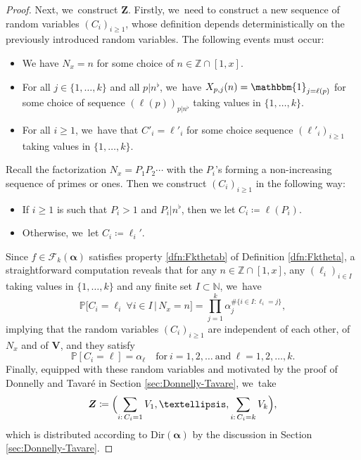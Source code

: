 \documentclass[10pt,a4paper]{amsart}
\newcommand{\bV}{{\boldsymbol V}}
\newcommand{\bZ}{{\boldsymbol Z}}
\newcommand{\NN}{\mathbb{N}}
\newcommand{\ZZ}{\mathbb{Z}}
\newcommand{\PP}{\mathbb{P}}
\newcommand{\boldalpha}{\boldsymbol{\alpha}}
\newcommand{\one}{\mathbbm{1}}
\newcommand{\bg}{\big}
\theoremstyle{plain}
\theoremstyle{definition}
\begin{document}
\begin{proof}
Next, we~construct $\bZ$. Firstly, we~need to construct a new sequence of random variables $(C_i)_{i\ge1}$, whose definition depends deterministically on the previously introduced random variables. The following events must occur:
\begin{itemize}
\item We have $N_x = n$ for some choice of $n \in \ZZ \cap [1, x]$.
\item For all $j \in \{1, \ldots, k\}$ and all $p|n^\flat$, we~have $X_{p, j}(n) = \one_{j=\ell(p)}$ for some choice of sequence $(\ell(p))_{p | n^\flat}$ taking values in $\{1, \ldots, k\}$.
\item For all $i \ge 1$, we~have that $C'_i = \ell'_i$ for some choice sequence $(\ell'_i)_{i \ge 1}$ taking values in $\{1, \ldots, k\}$.
\end{itemize}
Recall the factorization $N_x=P_1P_2\cdots$ with the $P_i$'s forming a non-increasing sequence of primes or ones. Then we construct $(C_i)_{i \ge 1}$ in the following way:
\begin{itemize}
\item If $i\ge1$ is such that $P_i > 1$ and $P_i|n^\flat$, then we let $C_i\coloneqq\ell(P_i)$.
\item Otherwise, we~let $C_i\coloneqq \ell_i'$.
\end{itemize}
Since $f\in\mathcal F_k(\boldalpha)$ satisfies property \eqref{dfn:Fkthetab} of Definition \ref{dfn:Fktheta}, a straightforward computation reveals that for any $n \in \ZZ \cap [1, x]$, any $(\ell_i)_{i \in I}$ taking values in $\{1, \ldots, k\}$ and any finite set $I \subset \NN$, we~have
\[
\PP\bg[C_i = \ell_i \ \forall i \in I\, |\,N_x = n\bg] = \prod_{j=1}^k \alpha_j^{\#\{i \in I : \ell_i = j\}},
\]
implying that the random variables $(C_i)_{i\ge1}$ are independent of each other, of $N_x$ and of $\bV$, and they satisfy
\[
\label{eq:C_i dfn}
\PP[C_i=\ell]=\alpha_\ell\quad\text{for}\ i=1,2,\dots\ \text{and}\ \ell=1,2,\dots,k.
\]
Finally, equipped with these random variables and motivated by the proof of Donnelly and Tavaré in Section \ref{sec:Donnelly-Tavare}, we~take
\[
\bZ \coloneqq \Bigl(\sum_{i:\, C_i=1} V_1, \ldots, \sum_{i:\, C_i=k} V_k \Bigr),
\]
which is distributed according to $\text{Dir}(\boldalpha)$ by the discussion in Section \ref{sec:Donnelly-Tavare}.


\end{proof}
\end{document}
